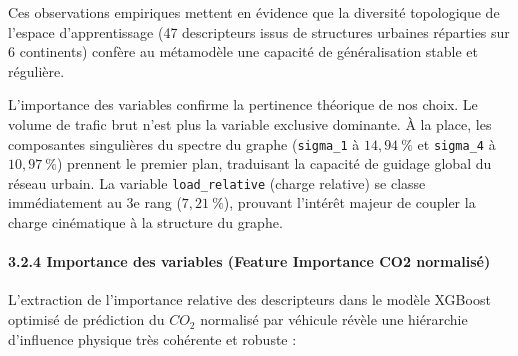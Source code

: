\documentclass[10pt, a4paper]{article}
\begin{document}
Ces observations empiriques mettent en évidence que la diversité
topologique de l'espace d'apprentissage (47 descripteurs issus de
structures urbaines réparties sur 6 continents) confère au métamodèle
une capacité de généralisation stable et régulière.

L'importance des variables confirme la pertinence théorique de nos
choix. Le volume de trafic brut n'est plus la variable exclusive
dominante. À la place, les composantes singulières du spectre du graphe
(\texttt{sigma\_1} à \(14,94\ \%\) et \texttt{sigma\_4} à \(10,97\ \%\))
prennent le premier plan, traduisant la capacité de guidage global du
réseau urbain. La variable \texttt{load\_relative} (charge relative) se
classe immédiatement au 3e rang (\(7,21\ \%\)), prouvant l'intérêt
majeur de coupler la charge cinématique à la structure du graphe.

\newpage

\paragraph{3.2.4 Importance des variables (Feature Importance CO2
normalisé)}\label{importance-des-variables-feature-importance-co2-normalisuxe9}

L'extraction de l'importance relative des descripteurs dans le modèle
XGBoost optimisé de prédiction du \(CO_2\) normalisé par véhicule révèle
une hiérarchie d'influence physique très cohérente et robuste :
\end{document}
